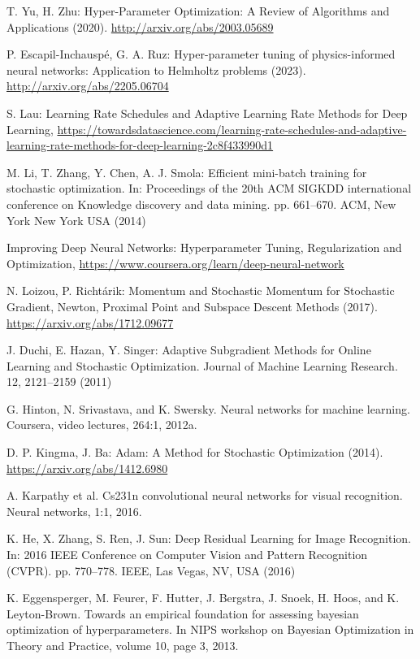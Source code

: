 \documentclass[reprint,
superscriptaddress,
amsmath,amssymb,aps,showkeys,showpacs,
twoside,final,secnumarabic,%
nofootinbib]{revtex4-2}
\begin{document}
\begin{thebibliography}{}
T. Yu, H. Zhu: Hyper-Parameter Optimization: A Review of Algorithms and Applications (2020). \url{http://arxiv.org/abs/2003.05689}

P. Escapil-Inchauspé, G. A. Ruz: Hyper-parameter tuning of physics-informed neural networks: Application to Helmholtz problems (2023). \url{http://arxiv.org/abs/2205.06704}

S. Lau: Learning Rate Schedules and Adaptive Learning Rate Methods for Deep Learning, \url{https://towardsdatascience.com/learning-rate-schedules-and-adaptive-learning-rate-methods-for-deep-learning-2c8f433990d1}

M. Li, T. Zhang, Y. Chen, A. J. Smola: Efficient mini-batch training for stochastic optimization. In: Proceedings of the 20th ACM SIGKDD international conference on Knowledge discovery and data mining. pp. 661–670. ACM, New York New York USA (2014)

Improving Deep Neural Networks: Hyperparameter Tuning, Regularization and Optimization, \url{https://www.coursera.org/learn/deep-neural-network}

N. Loizou, P. Richtárik: Momentum and Stochastic Momentum for Stochastic Gradient, Newton, Proximal Point and Subspace Descent Methods (2017). \url{https://arxiv.org/abs/1712.09677}

J. Duchi, E. Hazan, Y. Singer: Adaptive Subgradient Methods for Online Learning and Stochastic Optimization. Journal of Machine Learning Research. 12, 2121–2159 (2011)

G. Hinton, N. Srivastava, and K. Swersky. Neural networks for machine learning. Coursera, video lectures, 264:1, 2012a.

D. P. Kingma, J. Ba: Adam: A Method for Stochastic Optimization (2014). \url{https://arxiv.org/abs/1412.6980}

A. Karpathy et al. Cs231n convolutional neural networks for visual recognition. Neural networks, 1:1, 2016.

K. He, X. Zhang, S. Ren, J. Sun: Deep Residual Learning for Image Recognition. In: 2016 IEEE Conference on Computer Vision and Pattern Recognition (CVPR). pp. 770–778. IEEE, Las Vegas, NV, USA (2016)

K. Eggensperger, M. Feurer, F. Hutter, J. Bergstra, J. Snoek, H. Hoos, and K. Leyton-Brown. Towards an empirical foundation for assessing bayesian optimization of hyperparameters. In NIPS workshop on Bayesian Optimization in Theory and Practice, volume 10, page 3, 2013.


\end{thebibliography}
\end{document}
